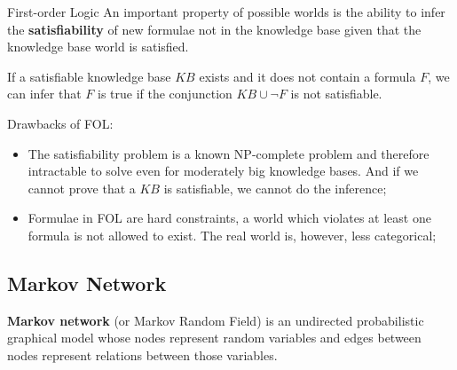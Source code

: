 \documentclass{beamer}
\begin{document}
\begin{frame}[fragile]{First-order Logic}
An important property of possible worlds is the ability to infer the
\textbf{satisfiability} of new formulae not in the knowledge base
given that the knowledge base world is satisfied.\vspace{0.5cm}

If a satisfiable knowledge base $KB$ exists and it does not contain a
formula $F$, we can infer that $F$ is true if the conjunction $KB \cup
\neg F$ is not satisfiable.
\end{frame}

\begin{frame}{\insertsubsection}
Drawbacks of FOL:
\begin{itemize}
  \item The satisfiability problem is a known NP-complete problem and
    therefore intractable to solve even for moderately big knowledge
    bases.  And if we cannot prove that a $KB$ is satisfiable, we
    cannot do the inference; 

  \item Formulae in FOL are hard constraints, a world which violates
    at least one formula is not allowed to exist.  The real world is,
    however, less categorical; 
\end{itemize}
\end{frame}

\subsection{Markov Network}
\begin{frame}{\insertsubsection}
  \begin{definition}
    \textbf{Markov network} (or Markov Random Field) is an undirected
    probabilistic graphical model whose nodes represent random
    variables and edges between nodes represent relations between
    those variables.
  \end{definition}
  \begin{example}
    \begin{center}
    \end{center}
  \end{example}
\end{frame}
\end{document}
